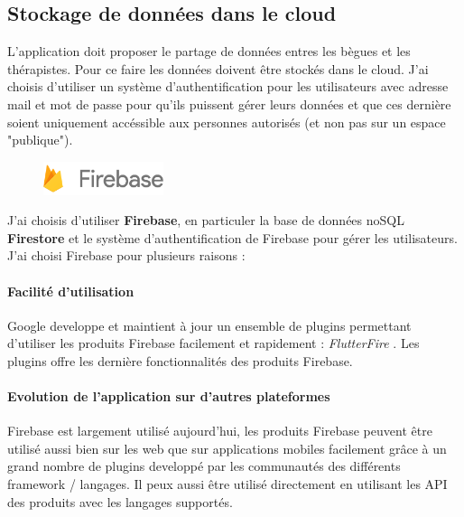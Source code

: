 \subsection{Stockage de données dans le cloud}

L'application doit proposer le partage de données entres les bègues et les thérapistes. Pour ce faire les données doivent être stockés dans le cloud. J'ai choisis d'utiliser un système d'authentification pour les utilisateurs avec adresse mail et mot de passe pour qu'ils puissent gérer leurs données et que ces dernière soient uniquement accéssible aux personnes autorisés (et non pas sur un espace "publique").

\begin{figure}
  \includegraphics[width=100pt]{content/imgs/firebase.png}
\end{figure}
J'ai choisis d'utiliser \textbf{Firebase}, en particuler la base de données noSQL \textbf{Firestore} et le système d'authentification de Firebase pour gérer les utilisateurs. J'ai choisi Firebase pour plusieurs raisons :

\paragraph{Facilité d'utilisation}
Google developpe et maintient à jour un ensemble de plugins permettant d'utiliser les produits Firebase facilement et rapidement :  \textit{FlutterFire} \cite{flutterfire}. Les plugins offre les dernière fonctionnalités des produits Firebase.

\paragraph{Evolution de l'application sur d'autres plateformes}
Firebase est largement utilisé aujourd'hui, les produits Firebase peuvent être utilisé aussi bien sur les web que sur applications mobiles facilement grâce à un grand nombre de plugins developpé par les communautés des différents framework / langages. Il peux aussi être utilisé directement en utilisant les API des produits avec les langages supportés.

